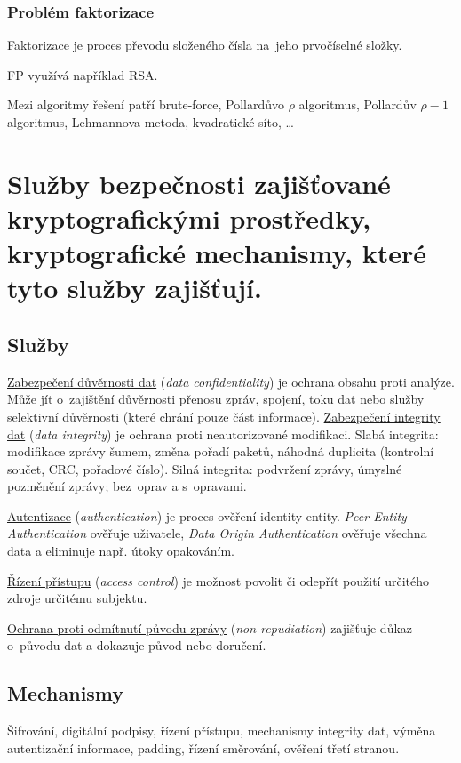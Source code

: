 \subsubsection{Problém faktorizace}

Faktorizace je proces převodu složeného čísla na~jeho prvočíselné složky.

FP využívá například RSA.

Mezi algoritmy řešení patří brute-force, Pollardůvo $\rho$ algoritmus, Pollardův $\rho - 1$ algoritmus, Lehmannova metoda, kvadratické síto, \dots


\clearpage
\section{Služby bezpečnosti zajišťované kryptografickými prostředky, kryptografické mechanismy, které tyto služby zajišťují.}

\subsection{Služby}

\uline{Zabezpečení důvěrnosti dat} (\emph{data confidentiality}) je ochrana obsahu proti analýze.
Může jít o~zajištění důvěrnosti přenosu zpráv, spojení, toku dat nebo služby selektivní důvěrnosti (které chrání pouze část informace).
\uline{Zabezpečení integrity dat} (\emph{data integrity}) je ochrana proti neautorizované modifikaci.
Slabá integrita: modifikace zprávy šumem, změna pořadí paketů, náhodná duplicita (kontrolní součet, CRC, pořadové číslo).
Silná integrita: podvržení zprávy, úmyslné pozměnění zprávy; bez~oprav a s~opravami.

\uline{Autentizace} (\emph{authentication}) je proces ověření identity entity.
\emph{Peer Entity Authentication} ověřuje uživatele,
\emph{Data Origin Authentication} ověřuje všechna data a eliminuje např. útoky opakováním.

\uline{Řízení přístupu} (\emph{access control}) je možnost povolit či odepřít použití určitého zdroje určitému subjektu.

\uline{Ochrana proti odmítnutí původu zprávy} (\emph{non-repudiation}) zajišťuje důkaz o~původu dat a dokazuje původ nebo doručení.

\subsection{Mechanismy}

Šifrování, digitální podpisy, řízení přístupu, mechanismy integrity dat, výměna autentizační informace, padding, řízení směrování, ověření třetí stranou.

